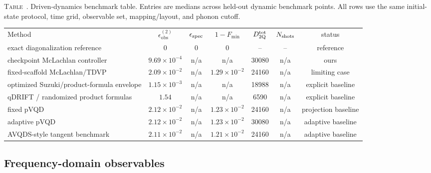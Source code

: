 \documentclass[
  reprint,
  amsmath,
  amssymb,
  aps,
  pra,
  nofootinbib,
  superscriptaddress,
  floatfix
]{revtex4-2}
\newcommand{\tentative}[1]{\textcolor{red!70!black}{#1}}
\newcommand{\obs}{\mathrm{obs}}
\newcommand{\twq}{\mathrm{2Q}}
\newcommand{\inlinetablecaption}[2]{%
  \refstepcounter{table}\label{#1}%
  \noindent\textsc{Table~\thetable.} #2\par\vspace{0.6ex}%
}
\begin{document}
\begin{widetext}
\inlinetablecaption{tab:dyn_claims}{Driven-dynamics benchmark table. Entries are medians across held-out dynamic benchmark points. All rows use the same initial-state protocol, time grid, observable set, mapping/layout, and phonon cutoff.}
\begin{center}
\begin{ruledtabular}
\begin{tabular}{lcccccc}
Method & $\epsilon_{\obs}^{(2)}$ & $\epsilon_{\rm spec}$ & $1-F_{\min}$ & $D_{\twq}^{\rm tot}$ & $N_{\rm shots}$ & status \\
\colrule
exact diagonalization reference & 0 & 0 & 0 & -- & -- & reference \\
checkpoint McLachlan controller & \tentative{$9.69\!\times\!10^{-4}$} & \tentative{n/a} & \tentative{n/a} & \tentative{30080} & \tentative{n/a} & ours \\
fixed-scaffold McLachlan/TDVP & \tentative{$2.09\!\times\!10^{-2}$} & \tentative{n/a} & \tentative{$1.29\!\times\!10^{-2}$} & \tentative{24160} & \tentative{n/a} & limiting case \\
optimized Suzuki/product-formula envelope & \tentative{$1.15\!\times\!10^{-3}$} & \tentative{n/a} & \tentative{n/a} & \tentative{18988} & \tentative{n/a} & explicit baseline \\
qDRIFT / randomized product formulas & \tentative{$1.54$} & \tentative{n/a} & \tentative{n/a} & \tentative{6590} & \tentative{n/a} & explicit baseline \\
fixed pVQD & \tentative{$2.12\!\times\!10^{-2}$} & \tentative{n/a} & \tentative{$1.23\!\times\!10^{-2}$} & \tentative{24160} & \tentative{n/a} & projection baseline \\
adaptive pVQD & \tentative{$2.12\!\times\!10^{-2}$} & \tentative{n/a} & \tentative{$1.23\!\times\!10^{-2}$} & \tentative{30080} & \tentative{n/a} & adaptive baseline \\
AVQDS-style tangent benchmark & \tentative{$2.11\!\times\!10^{-2}$} & \tentative{n/a} & \tentative{$1.21\!\times\!10^{-2}$} & \tentative{24160} & \tentative{n/a} & adaptive baseline \\
\end{tabular}
\end{ruledtabular}
\end{center}
\end{widetext}

\subsection{Frequency-domain observables}
\end{document}
